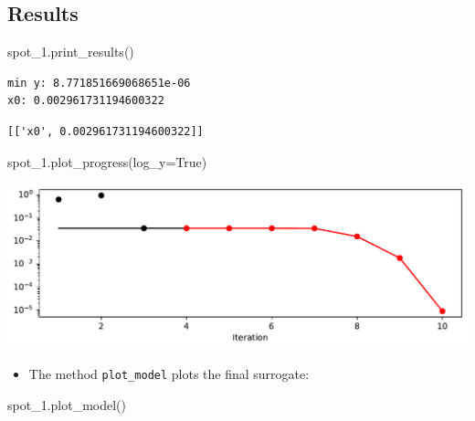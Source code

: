 \documentclass[
  letterpaper,
  DIV=11,
  numbers=noendperiod]{scrreprt}
\newenvironment{Shaded}{\begin{snugshade}}{\end{snugshade}}
\newcommand{\NormalTok}[1]{\textcolor[rgb]{0.00,0.23,0.31}{#1}}
\newcommand{\OperatorTok}[1]{\textcolor[rgb]{0.37,0.37,0.37}{#1}}
\newcommand{\VariableTok}[1]{\textcolor[rgb]{0.07,0.07,0.07}{#1}}
\providecommand{\tightlist}{%
  \setlength{\itemsep}{0pt}\setlength{\parskip}{0pt}}\usepackage{longtable,booktabs,array}
\begin{document}
\subsection{Results}\label{results-5}

\begin{Shaded}
\begin{Highlighting}[]
\NormalTok{spot\_1.print\_results()}
\end{Highlighting}
\end{Shaded}

\begin{verbatim}
min y: 8.771851669068651e-06
x0: 0.002961731194600322
\end{verbatim}

\begin{verbatim}
[['x0', 0.002961731194600322]]
\end{verbatim}

\begin{Shaded}
\begin{Highlighting}[]
\NormalTok{spot\_1.plot\_progress(log\_y}\OperatorTok{=}\VariableTok{True}\NormalTok{)}
\end{Highlighting}
\end{Shaded}

\includegraphics{010_num_spot_sklearn_surrogate_files/figure-pdf/cell-22-output-1.pdf}

\begin{itemize}
\tightlist
\item
  The method \texttt{plot\_model} plots the final surrogate:
\end{itemize}

\begin{Shaded}
\begin{Highlighting}[]
\NormalTok{spot\_1.plot\_model()}
\end{Highlighting}
\end{Shaded}
\end{document}
